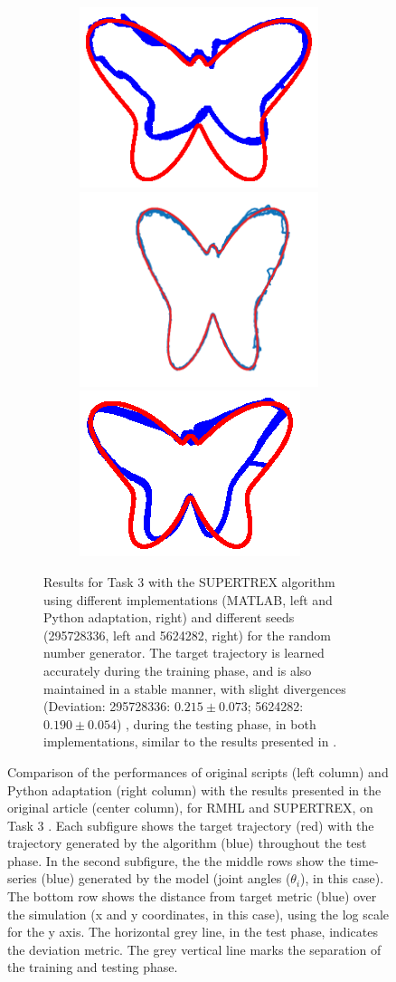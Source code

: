 \begin{figure}
\begin{subfigure}{\textwidth}
\begin{subfigure}{\textwidth}
        \includegraphics[trim=4cm 4.25cm 4cm 4.75cm, clip=true, height=.2\linewidth]{Figures/Fig_T4/MATLAB/ST_T3_Trajectory_295728336.eps}
        \hspace{1em}
        \includegraphics[height=.2\linewidth]{Figures/Fig_T4/Orig/ST_T3_Trajectory.png}
        \hspace{1em}
        \includegraphics[trim=6.5cm 4.75cm 6.5cm 5cm, clip=true,  height=.2\linewidth]{Figures/Fig_T4/Python/ST_T3_Trajectory_5624282.eps}
        
        \end{subfigure}
        

    \caption{Results for Task 3 with the SUPERTREX algorithm using different implementations (MATLAB, left and Python adaptation, right) and different seeds (295728336, left and 5624282, right) for the random number generator. The target trajectory is learned accurately during the training phase, and is also maintained in a stable manner, with slight divergences (Deviation: 295728336: $0.215\pm0.073$; 5624282: $0.190\pm0.054$) , during the testing phase, in both implementations, similar to the results presented in \cite{pyle2019}.}
    \label{Fig:compTask3STrseeed2}
    
    \end{subfigure}

        
\caption{Comparison of the performances of original scripts (left column) and Python adaptation (right column) with the results presented in the original article (center column), for RMHL and SUPERTREX, on Task 3 \cite{pyle2019}. Each subfigure shows the target trajectory (red) with the trajectory generated by the algorithm (blue) throughout the test phase. In the second subfigure, the the middle rows show the time-series (blue) generated by the model (joint angles ($\theta_i$), in this case). The bottom row shows the distance from target metric (blue) over the simulation (x and y coordinates, in this case), using the log scale for the y axis.  The horizontal grey line, in the test phase, indicates the deviation metric. The grey vertical line marks the separation of the training and testing phase.}
\label{Fig:Comparison_Task3}

\end{figure}